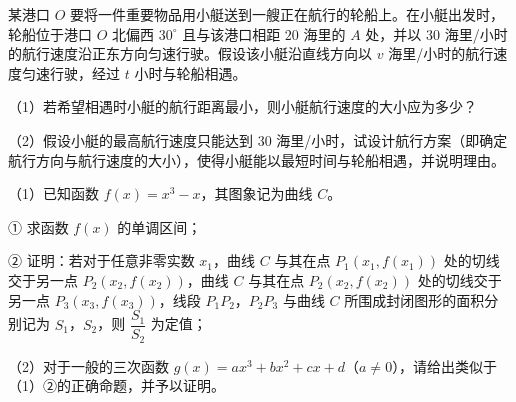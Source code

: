 \endgroup
\begin{question}
某港口 $O$ 要将一件重要物品用小艇送到一艘正在航行的轮船上。在小艇出发时，轮船位于港口 $O$ 北偏西 $30^\circ$ 且与该港口相距 $20$ 海里的 $A$ 处，并以 $30$ 海里/小时的航行速度沿正东方向匀速行驶。假设该小艇沿直线方向以 $v$ 海里/小时的航行速度匀速行驶，经过 $t$ 小时与轮船相遇。

（1）若希望相遇时小艇的航行距离最小，则小艇航行速度的大小应为多少？

（2）假设小艇的最高航行速度只能达到 $30$ 海里/小时，试设计航行方案（即确定航行方向与航行速度的大小），使得小艇能以最短时间与轮船相遇，并说明理由。

\end{question}
\begin{question}
（1）已知函数 $f(x)=x^3-x$，其图象记为曲线 $C$。

① 求函数 $f(x)$ 的单调区间；

② 证明：若对于任意非零实数 $x_1$，曲线 $C$ 与其在点 $P_1(x_1,f(x_1))$ 处的切线交于另一点 $P_2(x_2,f(x_2))$，曲线 $C$ 与其在点 $P_2(x_2,f(x_2))$ 处的切线交于另一点 $P_3(x_3,f(x_3))$，线段 $P_1P_2$，$P_2P_3$ 与曲线 $C$ 所围成封闭图形的面积分别记为 $S_1$，$S_2$，则 $\dfrac{S_1}{S_2}$ 为定值；

（2）对于一般的三次函数 $g(x)=ax^3+bx^2+cx+d$（$a\neq0$），请给出类似于（1）②的正确命题，并予以证明。

\end{question}
